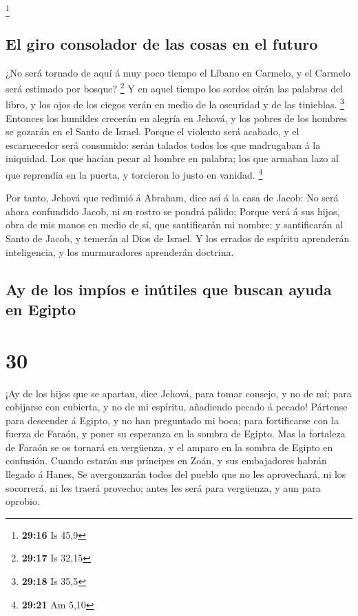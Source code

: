 \footnote{\textbf{29:16} Is 45,9}

\hypertarget{el-giro-consolador-de-las-cosas-en-el-futuro}{%
\subsection{El giro consolador de las cosas en el
futuro}\label{el-giro-consolador-de-las-cosas-en-el-futuro}}

 ¿No será tornado de aquí á muy poco tiempo el Líbano en
Carmelo, y el Carmelo será estimado por bosque? \footnote{\textbf{29:17}
  Is 32,15}  Y en aquel tiempo los sordos oirán las
palabras del libro, y los ojos de los ciegos verán en medio de la
oscuridad y de las tinieblas. \footnote{\textbf{29:18} Is 35,5}
 Entonces los humildes crecerán en alegría en Jehová, y
los pobres de los hombres se gozarán en el Santo de Israel.
 Porque el violento será acabado, y el escarnecedor será
consumido: serán talados todos los que madrugaban á la iniquidad.
 Los que hacían pecar al hombre en palabra; los que
armaban lazo al que reprendía en la puerta, y torcieron lo justo en
vanidad. \footnote{\textbf{29:21} Am 5,10}

 Por tanto, Jehová que redimió á Abraham, dice así á la
casa de Jacob: No será ahora confundido Jacob, ni su rostro se pondrá
pálido;  Porque verá á sus hijos, obra de mis manos en
medio de sí, que santificarán mi nombre; y santificarán al Santo de
Jacob, y temerán al Dios de Israel.  Y los errados de
espíritu aprenderán inteligencia, y los murmuradores aprenderán
doctrina.

\hypertarget{ay-de-los-impuxedos-e-inuxfatiles-que-buscan-ayuda-en-egipto}{%
\subsection{Ay de los impíos e inútiles que buscan ayuda en
Egipto}\label{ay-de-los-impuxedos-e-inuxfatiles-que-buscan-ayuda-en-egipto}}

\hypertarget{section-29}{%
\section{30}\label{section-29}}

 ¡Ay de los hijos que se apartan, dice Jehová, para tomar
consejo, y no de mí; para cobijarse con cubierta, y no de mi espíritu,
añadiendo pecado á pecado!  Pártense para descender á
Egipto, y no han preguntado mi boca; para fortificarse con la fuerza de
Faraón, y poner su esperanza en la sombra de Egipto.  Mas
la fortaleza de Faraón se os tornará en vergüenza, y el amparo en la
sombra de Egipto en confusión.  Cuando estarán sus
príncipes en Zoán, y sus embajadores habrán llegado á Hanes,
 Se avergonzarán todos del pueblo que no les aprovechará,
ni los socorrerá, ni les traerá provecho; antes les será para vergüenza,
y aun para oprobio.

